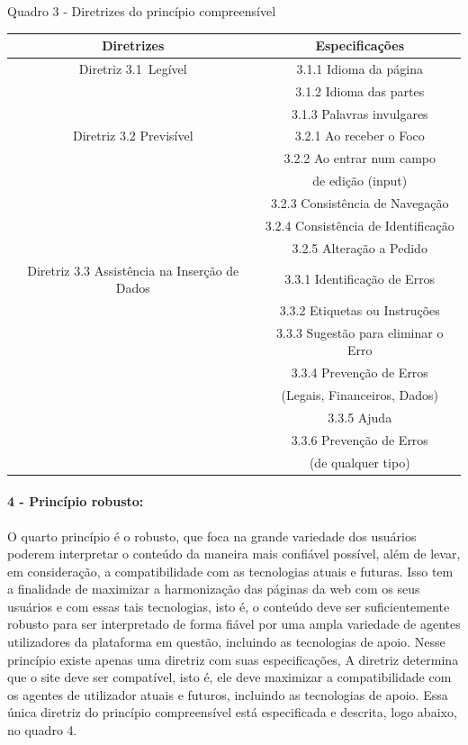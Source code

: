 \documentclass[a4paper]{article}
\begin{document}
\begin{titlepage}
Quadro 3 - Diretrizes do princípio compreensível\\[-1cm]
\begin{center}
	\fontsize{8pt}{8pt}\selectfont
	\begin{longtable}{|c|c|}
		\hline
		Diretrizes & Especificações \\
		\hline
		Diretriz 3.1 Legível& 3.1.1 Idioma da página\\
		& 3.1.2 Idioma das partes\\
		& 3.1.3 Palavras invulgares\\
		\hline
		Diretriz 3.2 Previsível & 3.2.1 Ao receber o Foco\\
		& 3.2.2 Ao entrar num campo\\
		& de edição (input)\\
		& 3.2.3 Consistência de Navegação\\
		& 3.2.4 Consistência de Identificação\\
		& 3.2.5 Alteração a Pedido\\
		\hline
		Diretriz 3.3 Assistência na Inserção de Dados& 3.3.1 Identificação de Erros\\
		& 3.3.2 Etiquetas ou Instruções\\
		& 3.3.3 Sugestão para eliminar o Erro\\
		& 3.3.4 Prevenção de Erros\\
		& (Legais, Financeiros, Dados)\\
		& 3.3.5 Ajuda\\
		& 3.3.6 Prevenção de Erros\\
		& (de qualquer tipo)\\
		\hline
	\end{longtable}
\end{center}

\paragraph{4 - Princípio robusto: }

O quarto princípio é o robusto, que foca na grande variedade dos usuários poderem interpretar o conteúdo da maneira mais confiável possível, além de levar, em consideração, a compatibilidade com as tecnologias atuais e futuras. Isso tem a finalidade de maximizar a harmonização das páginas da web com os seus usuários e com essas tais tecnologias, isto é, o conteúdo deve ser suficientemente robusto para ser interpretado de forma fiável por uma ampla variedade de agentes utilizadores da plataforma em questão, incluindo as tecnologias de apoio. Nesse princípio existe apenas uma diretriz com suas especificações, A diretriz determina que o site deve ser compatível, isto é, ele deve maximizar a compatibilidade com os agentes de utilizador atuais e futuros, incluindo as tecnologias de apoio. Essa única diretriz do princípio compreensível está especificada e descrita, logo abaixo, no quadro 4.


\end{titlepage}
\end{document}
